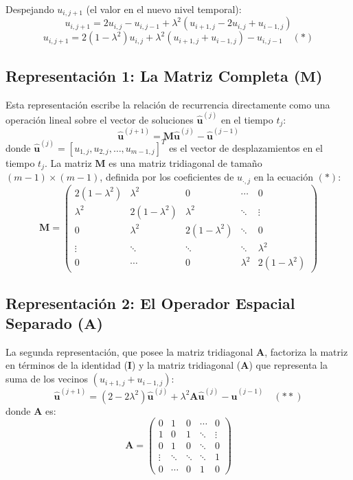 \documentclass{replab}
\begin{document}
Despejando $u_{i, j+1}$ (el valor en el nuevo nivel temporal):
$$ u_{i, j+1} = 2u_{i, j} - u_{i, j-1} + \lambda^2 (u_{i+1, j} - 2u_{i, j} + u_{i-1, j}) $$
$$ u_{i, j+1} = 2(1 - \lambda^2)u_{i, j} + \lambda^2(u_{i+1, j} + u_{i-1, j}) - u_{i, j-1} \quad (*) $$

\subsection*{Representación 1: La Matriz Completa ($\mathbf{M}$)}

Esta representación escribe la relación de recurrencia directamente como una operación lineal sobre el vector de soluciones $\mathbf{\hat{u}}^{(j)}$ en el tiempo $t_j$:
$$ \mathbf{\hat{u}}^{(j+1)} = \mathbf{M} \mathbf{\hat{u}}^{(j)} - \mathbf{\hat{u}}^{(j-1)} $$
donde $\mathbf{\hat{u}}^{(j)} = [u_{1, j}, u_{2, j}, \dots, u_{m-1, j}]^T$ es el vector de desplazamientos en el tiempo $t_j$.
La matriz $\mathbf{M}$ es una matriz tridiagonal de tamaño $(m-1) \times (m-1)$, definida por los coeficientes de $u_{\cdot, j}$ en la ecuación $(*)$:
$$ \mathbf{M} = 
\begin{pmatrix}
2(1 - \lambda^2) & \lambda^2 & 0 & \cdots & 0 \\
\lambda^2 & 2(1 - \lambda^2) & \lambda^2 & \ddots & \vdots \\
0 & \lambda^2 & 2(1 - \lambda^2) & \ddots & 0 \\
\vdots & \ddots & \ddots & \ddots & \lambda^2 \\
0 & \cdots & 0 & \lambda^2 & 2(1 - \lambda^2)
\end{pmatrix} $$

\subsection*{Representación 2: El Operador Espacial Separado ($\mathbf{A}$)}

La segunda representación, que posee la matriz tridiagonal $\mathbf{A}$, factoriza la matriz en términos de la identidad ($\mathbf{I}$) y la matriz tridiagonal ($\mathbf{A}$) que representa la suma de los vecinos $(u_{i+1, j} + u_{i-1, j})$:
$$ \mathbf{\hat{u}}^{(j+1)} = (2 - 2\lambda^2) \mathbf{\hat{u}}^{(j)} + \lambda^2 \mathbf{A} \mathbf{\hat{u}}^{(j)} - \mathbf{\hat{u}}^{(j-1)} \quad (**) $$
donde $\mathbf{A}$ es:
$$ \mathbf{A} = 
\begin{pmatrix}
0 & 1 & 0 & \cdots & 0 \\
1 & 0 & 1 & \ddots & \vdots \\
0 & 1 & 0 & \ddots & 0 \\
\vdots & \ddots & \ddots & \ddots & 1 \\
0 & \cdots & 0 & 1 & 0
\end{pmatrix} $$
\end{document}
